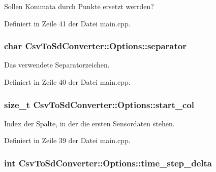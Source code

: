 Sollen Kommata durch Punkte ersetzt werrden? 



Definiert in Zeile 41 der Datei main.\-cpp.

\hypertarget{structCsvToSdConverter_1_1Options_abdcf3a6497aac513eedad80fd85b2f76}{
\subsubsection[{separator}]{\setlength{\rightskip}{0pt plus 5cm}char Csv\-To\-Sd\-Converter\-::\-Options\-::separator}}\label{structCsvToSdConverter_1_1Options_abdcf3a6497aac513eedad80fd85b2f76}


Das verwendete Separatorzeichen. 



Definiert in Zeile 40 der Datei main.\-cpp.

\hypertarget{structCsvToSdConverter_1_1Options_a8d822728dd7c9b03261be6e994fd198c}{
\subsubsection[{start\-\_\-col}]{\setlength{\rightskip}{0pt plus 5cm}size\-\_\-t Csv\-To\-Sd\-Converter\-::\-Options\-::start\-\_\-col}}\label{structCsvToSdConverter_1_1Options_a8d822728dd7c9b03261be6e994fd198c}


Index der Spalte, in der die ersten Sensordaten stehen. 



Definiert in Zeile 39 der Datei main.\-cpp.

\hypertarget{structCsvToSdConverter_1_1Options_ae9cfb41a40de65e8762ffa89c94302bd}{
\subsubsection[{time\-\_\-step\-\_\-delta}]{\setlength{\rightskip}{0pt plus 5cm}int Csv\-To\-Sd\-Converter\-::\-Options\-::time\-\_\-step\-\_\-delta}}\label{structCsvToSdConverter_1_1Options_ae9cfb41a40de65e8762ffa89c94302bd}


